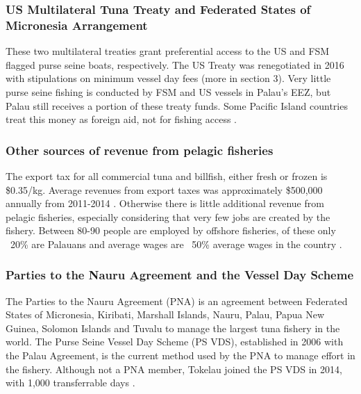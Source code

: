 \documentclass[11pt,english]{article}
\begin{document}
\subsubsection{US Multilateral Tuna Treaty and Federated States of Micronesia Arrangement}

These two multilateral treaties grant preferential access to the US and FSM flagged purse seine boats, respectively.  The US Treaty was renegotiated in 2016 with stipulations on minimum vessel day fees (more in section 3). Very little purse seine fishing is conducted by FSM and US vessels in Palau’s EEZ, but Palau still receives a portion of these treaty funds. Some Pacific Island countries treat this money as foreign aid, not for fishing access \citep{Gillett2016}. 

\subsubsection{Other sources of revenue from pelagic fisheries}

The export tax for all commercial tuna and billfish, either fresh or frozen is \$0.35/kg. Average revenues from export taxes was approximately \$500,000 annually from 2011-2014 \citep{Gillett2016}. Otherwise there is little additional revenue from pelagic fisheries, especially considering that very few jobs are created by the fishery. Between 80-90 people are employed by offshore fisheries, of these only ~20\% are Palauans and average wages are ~50\% average wages in the country \citep{Gillett2016}.

\subsubsection{Parties to the Nauru Agreement and the Vessel Day Scheme}

The Parties to the Nauru Agreement (PNA) is an agreement between Federated States of Micronesia, Kiribati, Marshall Islands, Nauru, Palau, Papua New Guinea, Solomon Islands and Tuvalu to manage the largest tuna fishery in the world. The Purse Seine Vessel Day Scheme (PS VDS), established in 2006 with the Palau Agreement, is the current method used by the PNA to manage effort in the fishery. Although not a PNA member, Tokelau joined the PS VDS in 2014, with 1,000 transferrable days \citep{PNA2014}.
\end{document}

